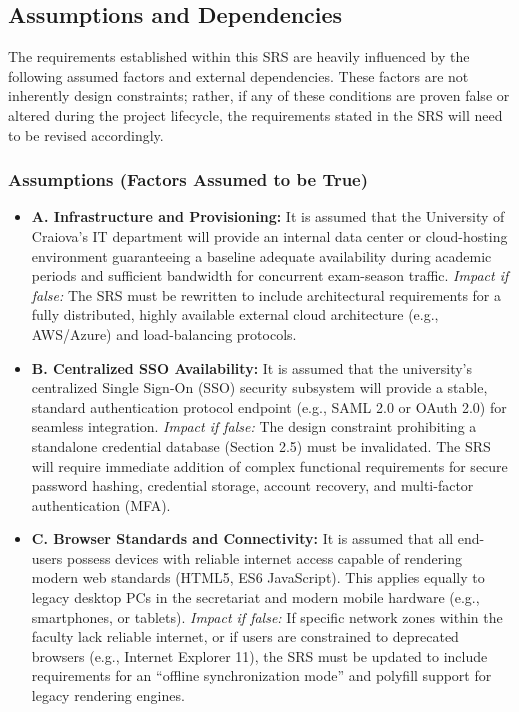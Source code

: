 \documentclass[11pt, a4paper]{article}
\begin{document}
\subsection{Assumptions and Dependencies}
The requirements established within this SRS are heavily influenced by the following assumed factors and external dependencies. These factors are not inherently design constraints; rather, if any of these conditions are proven false or altered during the project lifecycle, the requirements stated in the SRS will need to be revised accordingly.

\subsubsection{Assumptions (Factors Assumed to be True)}
\begin{itemize}
    \item \textbf{A. Infrastructure and Provisioning:} It is assumed that the University of Craiova's IT department will provide an internal data center or cloud-hosting environment guaranteeing a baseline adequate availability during academic periods and sufficient bandwidth for concurrent exam-season traffic.
    \textit{Impact if false:} The SRS must be rewritten to include architectural requirements for a fully distributed, highly available external cloud architecture (e.g., AWS/Azure) and load-balancing protocols.
    \item \textbf{B. Centralized SSO Availability:} It is assumed that the university’s centralized Single Sign-On (SSO) security subsystem will provide a stable, standard authentication protocol endpoint (e.g., SAML 2.0 or OAuth 2.0) for seamless integration.
    \textit{Impact if false:} The design constraint prohibiting a standalone credential database (Section 2.5) must be invalidated. The SRS will require immediate addition of complex functional requirements for secure password hashing, credential storage, account recovery, and multi-factor authentication (MFA).
    \item \textbf{C. Browser Standards and Connectivity:} It is assumed that all end-users possess devices with reliable internet access capable of rendering modern web standards (HTML5, ES6 JavaScript). This applies equally to legacy desktop PCs in the secretariat and modern mobile hardware (e.g., smartphones, or tablets).
    \textit{Impact if false:} If specific network zones within the faculty lack reliable internet, or if users are constrained to deprecated browsers (e.g., Internet Explorer 11), the SRS must be updated to include requirements for an ``offline synchronization mode'' and polyfill support for legacy rendering engines.

\end{itemize}
\end{document}
